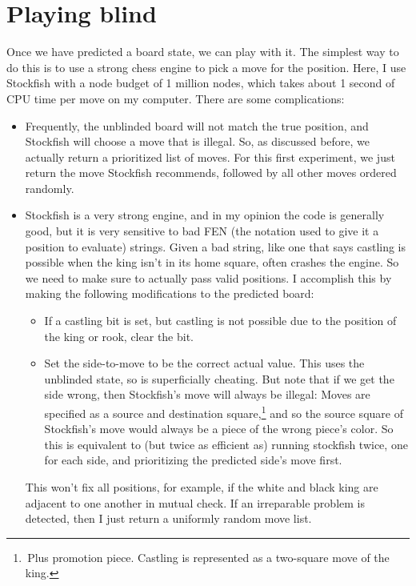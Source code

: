 \documentclass[twocolumn]{amsart}
\begin{document}
\section{Playing blind}

Once we have predicted a board state, we can play with it. The
simplest way to do this is to use a strong chess engine to pick a move
for the position. Here, I use Stockfish with a node budget of 1
million nodes, which takes about 1 second of CPU time per move on my
computer. There are some complications:
\begin{itemize}
\item Frequently, the unblinded board will not match the true
  position, and Stockfish will choose a move that is illegal. So, as discussed
  before, we actually return a prioritized list of moves. For this first
  experiment, we just return the move Stockfish recommends, followed by all
  other moves ordered randomly.
\item Stockfish is a very strong engine, and in my opinion the code is generally
  good, but it is very sensitive to bad FEN (the notation used to give it a
  position to evaluate) strings. Given a bad string, like one that says castling
  is possible when the king isn't in its home square, often crashes the engine.
  So we need to make sure to actually pass valid positions. I accomplish this
  by making the following modifications to the predicted board:
  \begin{itemize}
  \item If a castling bit is set, but castling is not possible due to
    the position of the king or rook, clear the bit.
  \item Set the side-to-move to be the correct actual value. This uses
    the unblinded state, so is superficially cheating. But note that
    if we get the side wrong, then Stockfish's move will always be
    illegal: Moves are specified as a source and destination
    square,\footnote{\,Plus promotion piece. Castling is represented as
      a two-square move of the king.} and so the source square of
    Stockfish's move would always be a piece of the wrong piece's
    color. So this is equivalent to (but twice as efficient as)
    running stockfish twice, one for each side, and prioritizing the
    predicted side's move first.
  \end{itemize}
  This won't fix all positions, for example, if the white and black king are
  adjacent to one another in mutual check. If an irreparable problem is detected,
  then I just return a uniformly random move list.
\end{itemize}
\end{document}
